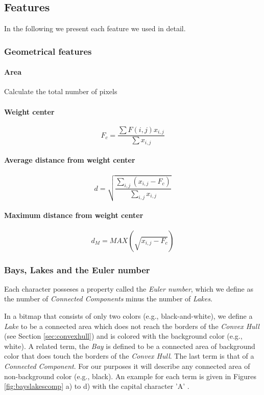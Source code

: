\documentclass{article}
\begin{document}
\subsection{Features}
In the following we present each feature we used in detail.

\subsubsection{Geometrical features}

\paragraph{Area}
Calculate the total number of pixels

\paragraph{Weight center}
\begin{equation}
F_c=\frac{\sum F(i,j)x_{i,j}}{\sum x_{i,j}}
\end{equation}

\paragraph{Average distance from weight center}
\begin{equation}
d = \sqrt{\frac{\sum_{i,j}(x_{i,j} - F_c)}{\sum_{i,j}x_{i,j}}}
\end{equation}

\paragraph{Maximum distance from weight center}
\begin{equation}
	d_M = MAX(\sqrt{x_{i,j}-F_c})
\end{equation}

\subsubsection{Bays, Lakes and the Euler number}
\label{sec:lakeseuler}
Each character posseses a property called the \textit{Euler number}, which we define as the number of \textit{Connected Components} minus the number of \textit{Lakes}.

In a bitmap that consists of only two colors (e.g., black-and-white), we define a \textit{Lake} to be a connected area which does not reach the borders of the \textit{Convex Hull} (see Section \ref{sec:convexhull}) and is colored with the background color (e.g., white). A related term, the \textit{Bay} is defined to be a connected area of background color that does touch the borders of the \textit{Convex Hull}. The last term is that of a \textit{Connected Component}. For our purposes it will describe any connected area of non-background color (e.g., black). An example for each term is given in Figures \ref{fig:bayslakescomp} a) to d) with the capital character 'A' .
\end{document}
